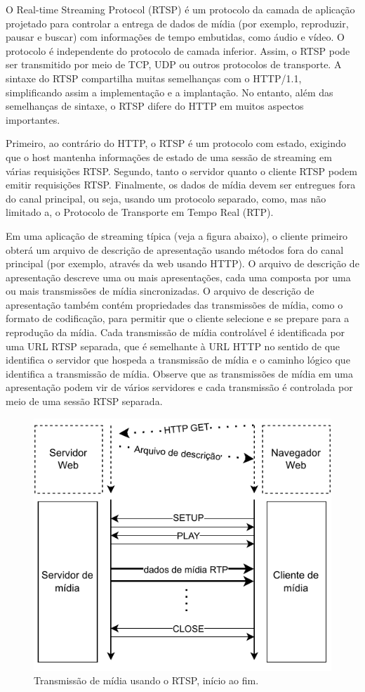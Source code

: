 \documentclass[12pt, %
openright, 
oneside, %
a4paper,    %
brazil]{facom-ufu-abntex2}
\begin{document}
O Real-time Streaming Protocol (RTSP) é um protocolo da camada de aplicação
projetado para controlar a entrega de dados de mídia (por exemplo, reproduzir,
pausar e buscar) com informações de tempo embutidas, como áudio e vídeo. O
protocolo é independente do protocolo de camada inferior. Assim, o RTSP pode
ser transmitido por meio de TCP, UDP ou outros protocolos de transporte. A
sintaxe do RTSP compartilha muitas semelhanças com o HTTP/1.1, simplificando
assim a implementação e a implantação. No entanto, além das semelhanças de
sintaxe, o RTSP difere do HTTP em muitos aspectos importantes.

Primeiro, ao contrário do HTTP, o RTSP é um protocolo com estado, exigindo que
o host mantenha informações de estado de uma sessão de streaming em várias
requisições RTSP. Segundo, tanto o servidor quanto o cliente RTSP podem emitir
requisições RTSP. Finalmente, os dados de mídia devem ser entregues fora do
canal principal, ou seja, usando um protocolo separado, como, mas não limitado
a, o Protocolo de Transporte em Tempo Real (RTP).

Em uma aplicação de streaming típica (veja a figura abaixo), o cliente primeiro
obterá um arquivo de descrição de apresentação usando métodos fora do canal
principal (por exemplo, através da web usando HTTP). O arquivo de descrição de
apresentação descreve uma ou mais apresentações, cada uma composta por uma ou
mais transmissões de mídia sincronizadas. O arquivo de descrição de
apresentação também contém propriedades das transmissões de mídia, como o
formato de codificação, para permitir que o cliente selecione e se prepare para
a reprodução da mídia. Cada transmissão de mídia controlável é identificada por
uma URL RTSP separada, que é semelhante à URL HTTP no sentido de que identifica
o servidor que hospeda a transmissão de mídia e o caminho lógico que identifica
a transmissão de mídia. Observe que as transmissões de mídia em uma
apresentação podem vir de vários servidores e cada transmissão é controlada por
meio de uma sessão RTSP separada. \cite{rfc2326}

\begin{figure}[!ht]
	\centering
	\includegraphics[width=0.8\linewidth]{rtsp.pdf}
	\caption[Diagrama RTSP]{Transmissão de mídia usando o RTSP, início ao
		fim. }

	\label{fig:rtspDiagram}
\end{figure}
\end{document}

